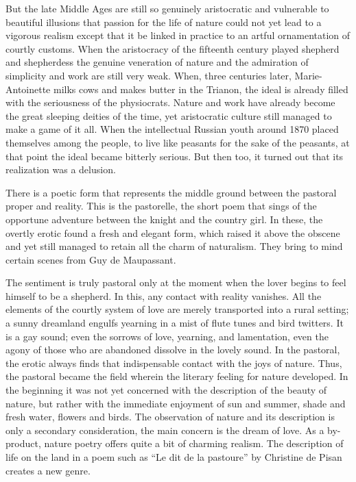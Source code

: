 But the late Middle Ages are still so genuinely aristocratic and
vulnerable to beautiful illusions that passion for the life of nature
could not yet lead to a vigorous realism except that it be linked in
practice to an artful ornamentation of courtly customs. When the
aristocracy of the fifteenth century played shepherd and shepherdess the
genuine veneration of nature and the admiration of simplicity and work
are still very weak. When, three centuries later, Marie-Antoinette milks
cows and makes butter in the Trianon, the ideal is already filled with
the seriousness of the physiocrats. Nature and work have already become
the great sleeping deities of the time, yet aristocratic culture still
managed to make a game of it all.
\protect\hypertarget{11_Chapter_Four__THE_FORMS_OF_LOVE.xhtmlux5cux23page_151}{}{}When
the intellectual Russian youth around 1870 placed themselves among the
people, to live like peasants for the sake of the peasants, at that
point the ideal became bitterly serious. But then too, it turned out
that its realization was a delusion.

There is a poetic form that represents the middle ground between the
pastoral proper and reality. This is the pastorelle, the short poem that
sings of the opportune adventure between the knight and the country
girl. In these, the overtly erotic found a fresh and elegant form, which
raised it above the obscene and yet still managed to retain all the
charm of naturalism. They bring to mind certain scenes from Guy de
Maupassant.

The sentiment is truly pastoral only at the moment when the lover begins
to feel himself to be a shepherd. In this, any contact with reality
vanishes. All the elements of the courtly system of love are merely
transported into a rural setting; a sunny dreamland engulfs yearning in
a mist of flute tunes and bird twitters. It is a gay sound; even the
sorrows of love, yearning, and lamentation, even the agony of those who
are abandoned dissolve in the lovely sound. In the pastoral, the erotic
always finds that indispensable contact with the joys of nature. Thus,
the pastoral became the field wherein the literary feeling for nature
developed. In the beginning it was not yet concerned with the
description of the beauty of nature, but rather with the immediate
enjoyment of sun and summer, shade and fresh water, flowers and birds.
The observation of nature and its description is only a secondary
consideration, the main concern is the dream of love. As a by-product,
nature poetry offers quite a bit of charming realism. The description of
life on the land in a poem such as ``Le dit de la pastoure'' by
Christine de Pisan creates a new genre.

